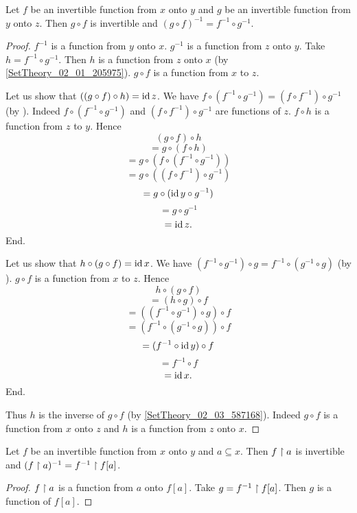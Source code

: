 \begin{forthel}
    \begin{proposition}\label{SetTheory_02_03_430030}
      Let $f$ be an invertible function from $x$ onto $y$ and $g$ be an invertible function from $y$ onto $z$.
      Then $g \circ f$ is invertible and $(g \circ f)^{-1} = f^{-1} \circ g^{-1}$.
    \end{proposition}
    \begin{proof}
      $f^{-1}$ is a function from $y$ onto $x$.
      $g^{-1}$ is a function from $z$ onto $y$.
      Take $h = f^{-1} \circ g^{-1}$.
      Then $h$ is a function from $z$ onto $x$ (by \ref{SetTheory_02_01_205975}).
      $g \circ f$ is a function from $x$ to $z$.

      Let us show that $((g \circ f) \circ h) = \operatorname{id}{z}$.
        We have $f \circ (f^{-1} \circ g^{-1}) = (f \circ f^{-1}) \circ g^{-1}$ (by ).
        Indeed $f \circ (f^{-1} \circ g^{-1})$ and $(f \circ f^{-1}) \circ g^{-1}$ are functions of $z$.
        $f \circ h$ is a function from $z$ to $y$.
        Hence
        \[   (g \circ f) \circ h \]
        \[ = g \circ (f \circ h) \]
        \[ = g \circ (f \circ (f^{-1} \circ g^{-1})) \]
        \[ = g \circ ((f \circ f^{-1}) \circ g^{-1}) \]
        \[ = g \circ (\operatorname{id}{y} \circ g^{-1}) \]
        \[ = g \circ g^{-1} \]
        \[ = \operatorname{id}{z}. \]
      End.

      Let us show that $h \circ (g \circ f) = \operatorname{id}{x}$.
        We have $(f^{-1} \circ g^{-1}) \circ g = f^{-1} \circ (g^{-1} \circ g)$ (by ).
        $g \circ f$ is a function from $x$ to $z$.
        Hence
        \[   h \circ (g \circ f) \]
        \[ = (h \circ g) \circ f \]
        \[ = ((f^{-1} \circ g^{-1}) \circ g) \circ f \]
        \[ = (f^{-1} \circ (g^{-1} \circ g)) \circ f \]
        \[ = (f^{-1} \circ \operatorname{id}{y}) \circ f \]
        \[ = f^{-1} \circ f \]
        \[ = \operatorname{id}{x}. \]
      End.

      Thus $h$ is the inverse of $g \circ f$ (by \ref{SetTheory_02_03_587168}).
      Indeed $g \circ f$ is a function from $x$ onto $z$ and $h$ is a function from $z$ onto $x$.
    \end{proof}

    \begin{proposition}\label{SetTheory_02_03_908585}
      Let $f$ be an invertible function from $x$ onto $y$ and $a \subseteq x$.
      Then $f \upharpoonright a$ is invertible and $(f\upharpoonright a)^{-1} = f^{-1} \upharpoonright f[a]$.
    \end{proposition}
    \begin{proof}
      $f \upharpoonright a$ is a function from $a$ onto $f[a]$.
      Take $g = f^{-1} \upharpoonright f[a]$.
      Then $g$ is a function of $f[a]$.


\end{proof}
\end{forthel}
